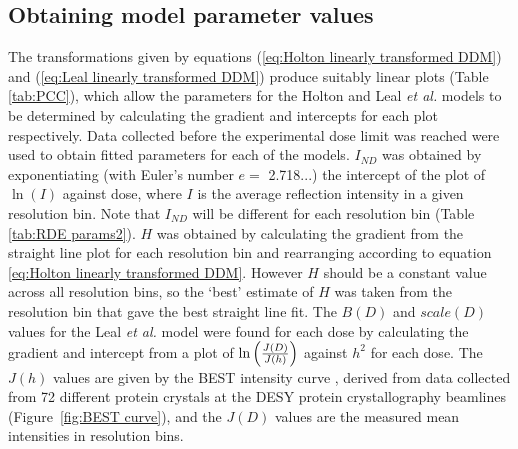 \subsection{Obtaining model parameter values}
\label{sub:Obtaining Model Parameter Values}
The transformations given by equations (\ref{eq:Holton linearly transformed DDM}) and (\ref{eq:Leal linearly transformed DDM}) produce suitably linear plots (Table \ref{tab:PCC}), which allow the parameters for the Holton and Leal \emph{et al.} models to be determined by calculating the gradient and intercepts for each plot respectively.
Data collected before the experimental dose limit was reached were used to obtain fitted parameters for each of the models.
$I_{ND}$ was obtained by exponentiating (with Euler's number $e =$ 2.718...) the intercept of the plot of $\ln(I)$ against dose, where $I$ is the average reflection intensity in a given resolution bin.
Note that $I_{ND}$ will be different for each resolution bin (Table \ref{tab:RDE params2}).
$H$ was obtained by calculating the gradient from the straight line plot for each resolution bin and rearranging according to equation \ref{eq:Holton linearly transformed DDM}.
However $H$ should be a constant value across all resolution bins, so the `best' estimate of $H$ was taken from the resolution bin that gave the best straight line fit.
\newline
The $B(D)$ and $scale(D)$ values for the Leal \emph{et al.} model were found for each dose by calculating the gradient and intercept from a plot of $\ln \left(\frac{J(D)}{J(h)}\right)$ against $h^2$ for each dose.
The $J(h)$ values are given by the BEST intensity curve \cite{popov2003}, derived from data collected from 72 different protein crystals at the DESY protein crystallography beamlines (Figure~\ref{fig:BEST curve}), and the $J(D)$ values are the measured mean intensities in resolution bins.
